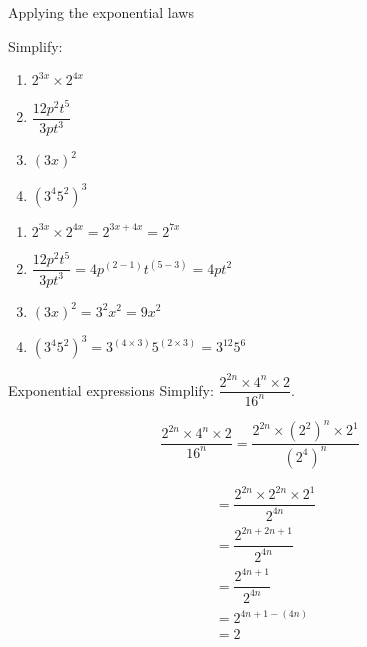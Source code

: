 \begin{wex}
{Applying the exponential laws}
{Simplify:
\begin{enumerate}[itemsep=6pt, label=\textbf{\arabic*}.]
\item $2^{3x} \times 2^{4x}$
\item $\dfrac{12p^2t^5}{3pt^3}$
\item $ (3x)^2 $
\item $(3^4 5^2)^3$
\end{enumerate}
}
{
\begin{enumerate}[itemsep=6pt, label=\textbf{\arabic*}.]
\item  $2^{3x} \times 2^{4x} = 2^{3x+4x} = 2^{7x}$
 \item $\dfrac{12p^2t^5}{3pt^3} = 4p^{(2-1)}t^{(5-3)} = 4pt^2$
 \item $ (3x)^2 = 3^2x^2 = 9x^2$
 \item $(3^4 5^2)^3 = 3^{(4\times3)} 5^{(2\times3)} = 3^{12} 5^6  $
\end{enumerate}
}
\end{wex}

\begin{wex}
{Exponential expressions}
{Simplify: $\dfrac{2^{2n} \times 4^n \times 2}{16^n}.$}
{

\begin{equation*}
  \dfrac{2^{2n} \times 4^n \times 2}{16^n} = \dfrac{2^{2n} \times (2^2)^n \times 2^1}{(2^4)^n} 
\end{equation*}

\begin{align*}
  &= \dfrac{2^{2n} \times 2^{2n} \times 2^1}{2^{4n}} \\
  &= \dfrac{2^{2n + 2n +1}}{2^{4n}} \\
  &= \dfrac{2^{4n+1}}{2^{4n}} \\
  &= 2^{4n+1-(4n)} \\
  &= 2
\end{align*}
}
\end{wex}

